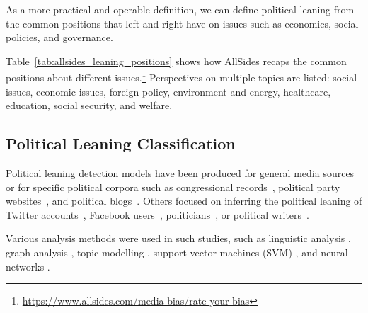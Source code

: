 As a more practical and operable definition, we can define political leaning from the common positions that left and right have on issues such as economics, social policies, and governance.

Table~\ref{tab:allsides_leaning_positions} shows how AllSides recaps the common positions about different issues.\footnote{\url{https://www.allsides.com/media-bias/rate-your-bias}}
Perspectives on multiple topics are listed: social issues, economic issues, foreign policy, environment and energy, healthcare, education, social security, and welfare.




\subsection{\statusgreen Political Leaning Classification}
\label{ssec:lit_leaning_classification}




Political leaning detection models have been produced for general media sources~\citep{budak} or for 
specific political corpora such as congressional records~\citep{gentzkow}, political party websites~\citep{yan2017perils}, and political blogs~\citep{ahmed201}.  
Others focused on inferring the political leaning of Twitter accounts~\citep{Cohen2013ClassifyingPO}, Facebook users~\citep{Bakshy1130}, politicians~\citep{thomas-etal-2006-get}, or political writers~\citep{iyyer-etal-2014-political}. 

Various analysis methods were used in such studies, such as linguistic analysis \citep{gentzkow}, graph analysis \citep{chen2017opinion}, topic modelling \citep{ahmed201, Cohen2013ClassifyingPO}, support vector machines (SVM) \citep{Bakshy1130,thomas-etal-2006-get}, and neural networks \citep{iyyer-etal-2014-political,baly2020we}.


